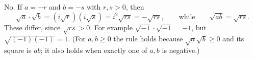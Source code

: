 No. If $a=-r$ and $b=-s$ with $r,s>0$, then
\[
\sqrt a\cdot\sqrt b=(i\sqrt r)(i\sqrt s)=i^2\sqrt{rs}=-\sqrt{rs},\qquad\text{while}\qquad\sqrt{ab}=\sqrt{rs}.
\]
These differ, since $\sqrt{rs}>0$. For example $\sqrt{-1}\cdot\sqrt{-1}=-1$, but $\sqrt{(-1)(-1)}=1$. (For $a,b\ge0$ the rule holds because $\sqrt a\sqrt b\ge0$ and its square is $ab$; it also holds when exactly one of $a,b$ is negative.)
